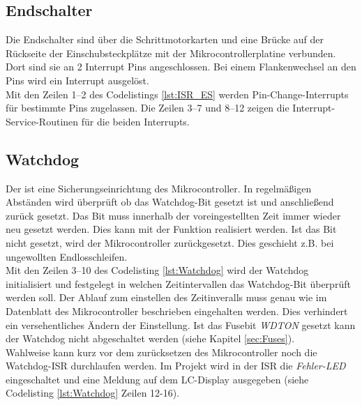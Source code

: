 \subsection{Endschalter}
\label{sec:Endschalter_SW}
Die Endschalter sind über die Schrittmotorkarten und eine Brücke auf der Rückseite der Einschubsteckplätze mit der Mikrocontrollerplatine verbunden. Dort sind sie an 2 Interrupt Pins angeschlossen. Bei einem Flankenwechsel an den Pins wird ein Interrupt ausgelöst. \\
Mit den Zeilen 1--2 des Codelistings \ref{lst:ISR_ES} werden Pin-Change-Interrupts für bestimmte Pins zugelassen. Die Zeilen 3--7 und 8--12 zeigen die Interrupt-Service-Routinen für die beiden Interrupts.
\lstset{language=C, basicstyle=\footnotesize, showstringspaces=false, tabsize=2}

\subsection{Watchdog}
Der  ist eine Sicherungseinrichtung des Mikrocontroller. In regelmäßigen Abständen wird überprüft ob das Watchdog-Bit gesetzt ist und anschließend zurück gesetzt. Das Bit muss innerhalb der voreingestellten Zeit immer wieder neu gesetzt werden. Dies kann mit der Funktion  realisiert werden. Ist das Bit nicht gesetzt, wird der Mikrocontroller zurückgesetzt. Dies geschieht z.B. bei ungewollten Endlosschleifen.\\
Mit den Zeilen 3--10 des Codelisting \ref{lst:Watchdog} wird der Watchdog initialisiert und festgelegt in welchen Zeitintervallen das Watchdog-Bit überprüft werden soll. Der Ablauf zum einstellen des Zeitinveralls muss genau wie im Datenblatt des Mikrocontroller beschrieben eingehalten werden. Dies verhindert ein versehentliches Ändern der Einstellung. 
Ist das Fusebit \emph{WDTON} gesetzt kann der Watchdog nicht abgeschaltet werden (siehe Kapitel \ref{sec:Fuses}).\\
Wahlweise kann kurz vor dem zurücksetzen des Mikrocontroller noch die Watchdog-ISR durchlaufen werden. Im Projekt wird in der ISR die \emph{Fehler-LED} eingeschaltet und eine Meldung auf dem LC-Display ausgegeben (siehe Codelisting \ref{lst:Watchdog} Zeilen 12-16).
\lstset{language=C, basicstyle=\footnotesize, showstringspaces=false, tabsize=4}


